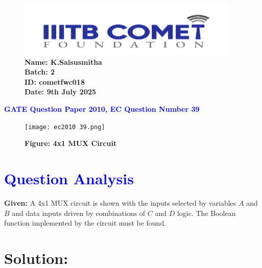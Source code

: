 \documentclass[twocolumn]{article}
\begin{document}
\begin{figure}[t]
        \includegraphics[width=\linewidth]{img3.png} %
        \textbf{Name: K.Saisusmitha} \\
        \textbf{Batch: 2} \\
        \textbf{ID: cometfwc018} \\
        \textbf{Date: 9th July 2025}
\end{figure}

\begin{center}
    {\LARGE \textbf{\textcolor{blue}{GATE Question Paper 2010, EC Question Number 39}}}
\end{center}

\vspace{1em}
\begin{figure}[h]
    \centering
    \texttt{[image: ec2010 39.png]}
\caption*{\textbf{Figure: 4x1 MUX Circuit}}
\end{figure}

\section*{\textcolor{blue}{Question Analysis}}
\textbf{Given:} A 4x1 MUX circuit is shown with the inputs selected by variables $A$ and $B$ and data inputs driven by combinations of $C$ and $D$ logic. The Boolean function implemented by the circuit must be found.

\section*{Solution:}
\end{document}
